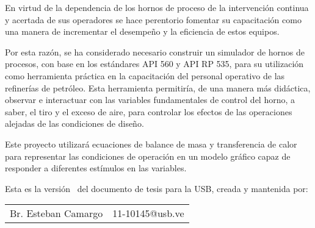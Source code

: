 \par En virtud de la dependencia de los hornos de proceso de la intervención continua y acertada de sus operadores se hace perentorio fomentar su capacitación como una manera de incrementar el desempeño y la eficiencia de estos equipos. 

\par Por esta razón, se ha considerado necesario construir un simulador de hornos de procesos, con base en los estándares API 560 y API RP 535, para su utilización como herramienta práctica en la capacitación del personal operativo de las refinerías de petróleo. Esta herramienta permitiría, de una manera más didáctica, observar e interactuar con las variables fundamentales de control del horno, a saber, el tiro y el exceso de aire, para controlar los efectos de las operaciones alejadas de las condiciones de diseño.

\par Este proyecto utilizará ecuaciones de balance de masa y transferencia de calor para representar las condiciones de operación en un modelo gráfico capaz de responder a diferentes estímulos en las variables. 
\vfill
\par Esta es la versión \version~del documento de tesis para la \ac{USB}, creada y mantenida por:\\
\begin{tabular}{lc}
Br. Esteban Camargo & 11-10145@usb.ve 
\end{tabular}